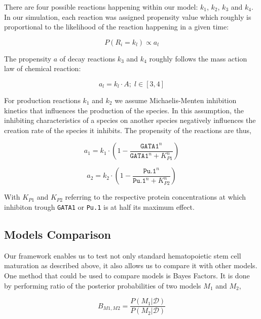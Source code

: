 \documentclass{bioinfo}
\begin{document}
There are four possible reactions happening within our model: $k_1$, $k_2$, $k_3$ and $k_4$. In our simulation, each reaction was assigned propensity value which roughly is proportional to the likelihood of the reaction happening in a given time:

\begin{equation}
P(R_i = k_l) \propto a_l\label{eq:22}
\end{equation}

The propensity $a$ of decay reactions $k_3$ and $k_4$ roughly follows the mass action law of chemical reaction:

\begin{equation}
a_l = k_l \cdot A {;} \; l \in [3, 4]\label{eq:23}
\end{equation}

For production reactions $k_1$ and $k_2$ we assume Michaelis-Menten inhibition kinetics that influences the production of the species. In this assumption, the inhibiting characteristics of a species on another species negatively influences the creation rate of the species it inhibits. The propensity of the reactions are thus,

\begin{equation}
a_1 = k_1 \cdot (1 - \frac{\texttt{GATA1}^{n}}{\texttt{GATA1}^{n} + K_{P1}^{n}})\label{eq:24}
\end{equation}

\begin{equation}
a_2 = k_2 \cdot (1 - \frac{\texttt{Pu.1}^{n}}{\texttt{Pu.1}^{n} + K_{P2}^{n}})\label{eq:25}
\end{equation}

With $K_{P1}$ and $K_{P2}$ referring to the respective protein concentrations at which inhibiton trough \texttt{GATA1} or \texttt{Pu.1} is at half its maximum effect.

\subsection{Models Comparison}

Our framework enables us to test not only standard hematopoietic stem cell maturation as described above, it also allows us to compare it with other models. One method that could be used to compare models is Bayes Factors. It is done by performing ratio of the posterior probabilities of two models $M_1$ and $M_2$,

\begin{equation}
B_{M1, M2} = \frac{P(M_1 | \mathcal{D})}{P(M_2 | \mathcal{D})}\label{eq:26}
\end{equation}
\end{document}

